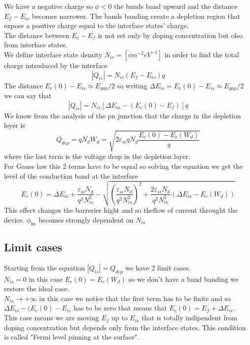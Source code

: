 We have a negative charge so $\phi<0$ the bands band upward and the distance $E_f-E_{is}$ becomes narrower. The bands banding create a depletion region that expose a positive charge equal to the interface states' charge.\\
The distance between $E_c-E_f$ is not set only by doping concentration but olso from interface states.\\
We define interface state density $N_{is} = [cm^{-2}eV^{-1}]$ in order to find the total charge introduced by the interface 
\begin{equation}
|Q_{is}|=N_{is}(E_f-E_{is})q
\end{equation}
The distance $E_c(0)-E_{is}\simeq E_{gap}/2$ so writing $\Delta E_{is}=E_c(0)-E_{is}\simeq E_{gap}/2$ we can say that
\begin{equation}
|Q_{is}|=N_{is}[\Delta E_{is}-(E_c(0)-E_{f})]q
\end{equation}
We know from the analysis of the pn junction that the charge in the depletion leyer is 
\begin{equation}
Q_{dep}=qN_dW_d=\sqrt{2\varepsilon_{si}qN_d\frac{E_c(0)-E_c(W_d)}{q}}
\end{equation}
where the last term is the voltage drop in the depletion layer.\\
For Gauss law this 2 terms have to be equal so solving the equation we get the level of the conduction band at the interface 
\begin{equation}
E_c(0)=\Delta E_{is}+\frac{\varepsilon_{si}N_d}{q^2N^2_{is}}-\sqrt{(\frac{\varepsilon_{si}N_d}{q^2N^2_{is}})^2+\frac{2\varepsilon_{si}N_d}{q^2N^2_{is}}(\Delta E_{is}-E_c(W_d))}
\end{equation}
This effect changes the barrerier hight and so theflow of current throught the device. $\phi_{bn}$ becomes strongly dependent on $N_{is}$

\subsection{Limit cases}
Starting from the equation $|Q_{is}|=Q_{dep}$ we have 2 limit cases.\\
$N_{is}=0$ in this case $E_c(0)=E_c(W_d)$ so we don't have a band banding we restore the ideal case.\\
$N_{is}\rightarrow +\infty$ in this case we notice that the first term has to be finite and so $\Delta E_{is}-(E_c(0)-E_{is}$ has to be zero that means that $E_c(0)=E_f+\Delta E_{is}$. \\
This case means we are moving $E_{f}$ up to $E_{is}$ that is totally indipendent from doping concentration but depends only from the interface states. This condition is called "Fermi level pinning at the surface".\\

